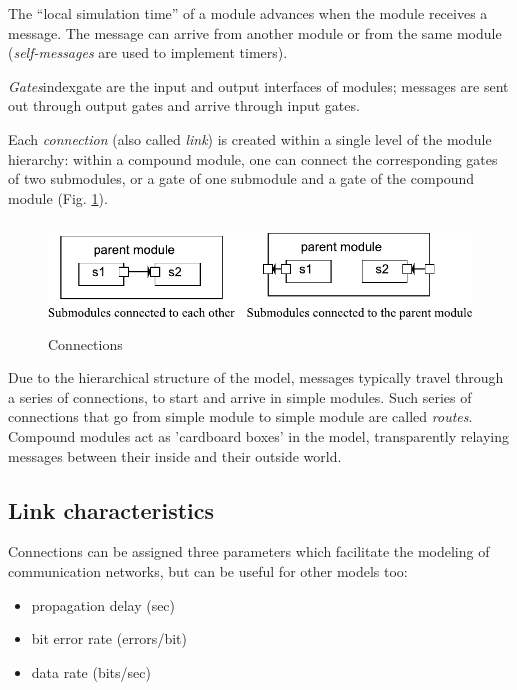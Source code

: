The ``local simulation time'' of a module advances when the module
receives a message. The message can arrive from another module
or from the same module (\textit{self-messages} are used to implement
timers).


\textit{Gates}index{gate} are the input and output interfaces of
modules; messages are sent out through output gates and arrive through
input gates.

Each \textit{connection} (also called
\textit{link}) is created within a single level of the
module hierarchy: within a compound module, one can connect the
corresponding gates of two submodules, or a gate of one submodule and
a gate of the compound module (Fig.
\ref{fig:ch-overview:connections}).

\begin{figure}[htbp]
\begin{center}
\includegraphics[width=5.061in, height=1.121in]{figures/usmanFig3}
\caption{Connections}
\label{fig:ch-overview:connections}
\end{center}
\end{figure}

Due to the hierarchical structure of the model, messages typically
travel through a series of connections, to start and arrive in simple
modules. Such series of connections that go from simple module to
simple module are called \textit{routes}.  Compound modules act as
'cardboard boxes' in the model, transparently relaying messages
between their inside and their outside world.


\subsection{Link characteristics}

Connections can be assigned three parameters which facilitate
the modeling of communication networks, but can be useful for
other models too:
\begin{itemize}
  \item{propagation delay (sec)}
  \item{bit error rate (errors/bit)}
  \item{data rate (bits/sec)}
\end{itemize}


